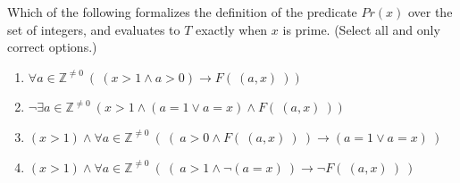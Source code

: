 
Which of the following formalizes the definition of the predicate
$Pr(x)$ over the set of integers, and evaluates to $T$ exactly when 
$x$ is prime. (Select all and only correct options.)

\begin{enumerate}
    \item $\forall a \in \mathbb{Z}^{\neq 0}~( ~(x > 1 \land a >0) \to F(~(a,x)~))$
    \item $\lnot \exists a \in \mathbb{Z}^{\neq 0} ~(x > 1 \land (a=1 \lor a=x) \land F(~(a,x)~))$
    \item $(x > 1) \land \forall a \in \mathbb{Z}^{\neq 0}~( ~(~ a>0 \land F(~(a,x)~)~) \to (a=1 \lor a=x)~)$
    \item $(x > 1) \land \forall a \in \mathbb{Z}^{\neq 0}~( ~(~ a>1 \land \lnot (a=x) ~) \to \lnot F(~(a,x)~)~)$
\end{enumerate}